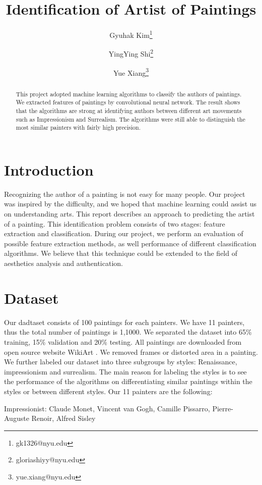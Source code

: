 \documentclass[11pt,a4paper]{article}
\title{Identification of Artist of Paintings}
\date{\vspace{-5ex}}
\author[1]{Gyuhak Kim\thanks{gk1326@nyu.edu}}
\author[1]{YingYing Shi\thanks{gloriashiyy@nyu.edu}}
\author[2]{Yue Xiang\thanks{yue.xiang@nyu.edu}}
\affil[1]{Department of Mathematics, New York University}
\affil[2]{Department of Computer Science, New York University}
\begin{document}
\maketitle
\begin{abstract}
This project adopted machine learning algorithms to classify the authors of paintings. We extracted features of paintings by convolutional neural network. The result shows that the algorithms are strong at identifying authors between different art movements such as Impressionism and Surrealism. The algorithms were still able to distinguish the most similar painters with fairly high precision.
\end{abstract}


\section{Introduction}
Recognizing the author of a painting is not easy for many people. Our project was inspired by the difficulty, and we hoped that machine learning could assist us on understanding arts. This report describes an approach to predicting the artist of a painting. This identification problem consists of two stages: feature extraction and classification. During our project, we perform an evaluation of possible feature extraction methods, as well performance of different classification algorithms. We believe that this technique could be extended to the field of aesthetics analysis and authentication. 

\section{Dataset}
Our dadtaset consists of 100 paintings for each painters. We have 11 painters, thus the total number of paintings is 1,1000. We separated the dataset into 65\% training, 15\% validation and 20\% testing. All paintings are downloaded from open source website WikiArt \cite{WikiArt}. We removed frames or distorted area in a painting. We further labeled our dataset into three subgroups by styles: Renaissance, impressionism and surrealism. The main reason for labeling the styles is to see the performance of the algorithms on differentiating similar paintings within the styles or between different styles.
Our 11 painters are the following: 
\vspace{0.1in}

\noindent 
{\small Impressionist: Claude Monet, Vincent van Gogh, Camille Pissarro, Pierre-Auguste Renoir, Alfred Sisley}
\end{document}

